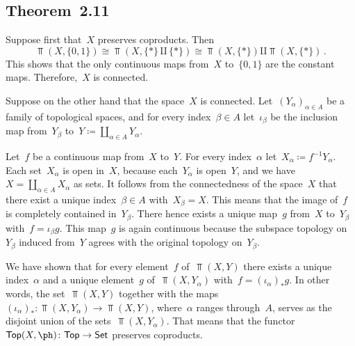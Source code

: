 \subsection{Theorem~2.11}

Suppose first that~$X$ preserves coproducts.
Then
\[
	\Top(X, \{0, 1\})
	≅
	\Top(X, \{ \ast \} ⨿ \{ \ast \})
	≅
	\Top(X, \{ \ast \}) ⨿ \Top(X, \{ \ast \}) \,.
\]
This shows that the only continuous maps from~$X$ to~$\{0, 1\}$ are the constant maps.
Therefore,~$X$ is connected.

Suppose on the other hand that the space~$X$ is connected.
Let~$(Y_α)_{α ∈ A}$ be a family of topological spaces, and for every index~$β ∈ A$ let~$ι_β$ be the inclusion map from~$Y_β$ to~$Y ≔ ∐_{α ∈ A} Y_α$.

Let~$f$ be a continuous map from~$X$ to~$Y$.
For every index~$α$ let~$X_α ≔ f^{-1} Y_α$.
Each set~$X_α$ is open in~$X$, because each~$Y_α$ is open~$Y$, and we have~$X = ∐_{α ∈ A} X_α$ as sets.
It follows from the connectedness of the space~$X$ that there exist a unique index~$β ∈ A$ with~$X_β = X$.
This means that the image of~$f$ is completely contained in~$Y_β$.
There hence exists a unique map~$g$ from~$X$ to~$Y_β$ with~$f = ι_β g$.
This map~$g$ is again continuous because the subspace topology on~$Y_β$ induced from~$Y$ agrees with the original topology on~$Y_β$.

We have shown that for every element~$f$ of~$\Top(X, Y)$ there exists a unique index~$α$ and a unique element~$g$ of~$\Top(X, Y_α)$ with~$f = (ι_α)_* g$.
In other words, the set~$\Top(X, Y)$ together with the maps~$(ι_α)_* \colon \Top(X, Y_α) \to \Top(X, Y)$, where~$α$ ranges through~$A$, serves as the disjoint union of the sets~$\Top(X, Y_α)$.
That means that the functor~$\Top(X, \ph) \colon \Top \to \Set$ preserves coproducts.
